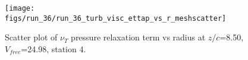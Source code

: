 \begin{figure}[H]
\centering
\texttt{[image: figs/run\_36/run\_36\_turb\_visc\_ettap\_vs\_r\_meshscatter]}
\caption{Scatter plot of $\nu_T$ pressure relaxation term vs radius at $z/c$=8.50, $V_{free}$=24.98, station 4.}
\label{fig:run_36_turb_visc_ettap_vs_r_meshscatter}
\end{figure}


